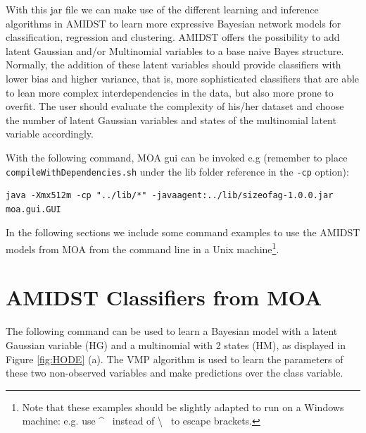 With this jar file we can make use of the different learning and inference algorithms in AMIDST to learn more expressive Bayesian network models for classification, regression and clustering. AMIDST offers the possibility to add latent Gaussian and/or Multinomial variables to a base naive Bayes structure. Normally, the addition of these latent variables should provide classifiers with lower bias and higher variance, that is, more sophisticated classifiers that are able to lean more complex interdependencies in the data, but also more prone to overfit. The user should evaluate the complexity of his/her dataset and choose the number of latent Gaussian variables and states of the multinomial latent variable accordingly.

With the following command, MOA gui can be invoked e.g (remember to place \texttt{compileWithDependencies.sh} under the lib folder reference in the \verb'-cp' option):

\begin{verbatim}
java -Xmx512m -cp "../lib/*" -javaagent:../lib/sizeofag-1.0.0.jar
moa.gui.GUI
\end{verbatim}

In the following sections we include some command examples to use the AMIDST models from MOA from the command line in a Unix machine\footnote{Note that these examples should be slightly adapted to run on a Windows machine: e.g. use \textasciicircum~ instead of \textbackslash~ to escape brackets.}.

\section{AMIDST Classifiers from MOA}

The following command can be used to learn a Bayesian model with a latent Gaussian variable (HG) and a multinomial with 2 states (HM), as displayed in Figure \ref{fig:HODE} (a). The VMP algorithm is used to learn the parameters of these two non-observed variables and make predictions over the class variable.


